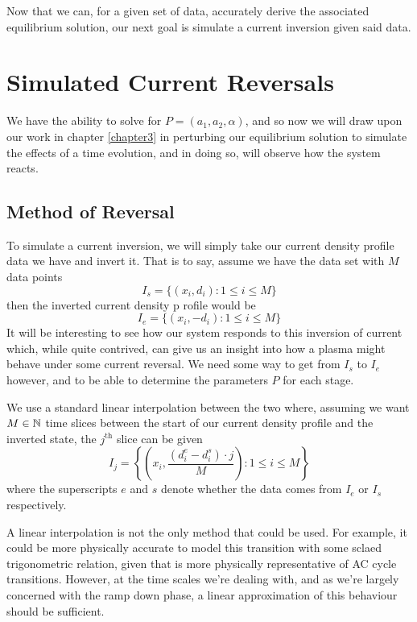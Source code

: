 Now that we can, for a given set of data, accurately derive the associated equilibrium solution, 
our next goal is simulate a current inversion given said data.

\section{Simulated Current Reversals}

We have the ability to solve for $P = (a_1, a_2, \alpha)$, and so now we will draw upon our 
work in chapter \ref{chapter3} in perturbing our equilibrium solution to simulate the effects of 
a time evolution, and in doing so, will observe how the system reacts.


\subsection{Method of Reversal}

To simulate a current inversion, we will simply take our current density profile data we have and invert it.
That is to say, assume we have the data set with $M$ data points 
$$I_s = \lbrace (x_i, d_i) : 1 \le i \le M \rbrace$$
then the inverted current density p rofile would be
$$I_e = \lbrace (x_i, -d_i) : 1 \le i \le M \rbrace $$
It will be interesting to see how our system responds to this inversion of current which, 
while quite contrived, can give us an insight into how 
a plasma might behave under some current reversal. We need some way to get from $I_s$ to 
$I_e$ however, and to be able to determine the parameters $P$ for each stage. 

We use a standard linear interpolation between the two where, assuming we want $M \in \mathbb{N}$ time slices
between the start of our current density profile and the inverted state, 
the $j^{\text{th}}$ slice can be given
$$I_j = \left \lbrace \left (x_i, \frac{(d_{i}^{e} - d_{i}^{s}) \cdot j}{M} \right ): 1 \le i \le M \right \rbrace$$
where the superscripts $e$ and $s$ denote whether the data comes from $I_e$ or $I_s$ respectively.

\begin{remark}
    A linear interpolation is not the only method that could be used. For example, it could be more physically accurate 
    to model this transition with some sclaed trigonometric relation, given that is more physically representative of AC cycle transitions. However, 
    at the time scales we're dealing with, and as we're largely concerned with the ramp down phase, a linear approximation 
    of this behaviour should be sufficient.
\end{remark}

